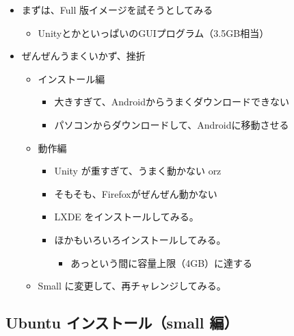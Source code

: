 \documentclass[mingoth,a4paper]{jsarticle}
\begin{document}
\begin{itemize}
 \item まずは、Full 版イメージを試そうとしてみる
       \begin{itemize}
        \item UnityとかといっぱいのGUIプログラム（3.5GB相当）
       \end{itemize}
 \item ぜんぜんうまくいかず、挫折
       \begin{itemize}
        \item インストール編
              \begin{itemize}
               \item 大きすぎて、Androidからうまくダウンロードできない
               \item パソコンからダウンロードして、Androidに移動させる
              \end{itemize}
        \item 動作編
              \begin{itemize}
               \item Unity が重すぎて、うまく動かない orz
               \item そもそも、Firefoxがぜんぜん動かない
               \item LXDE をインストールしてみる。
               \item ほかもいろいろインストールしてみる。
                     \begin{itemize}
                      \item あっという間に容量上限（4GB）に達する
                     \end{itemize}
              \end{itemize}
        \item Small に変更して、再チャレンジしてみる。
       \end{itemize}
\end{itemize}

\subsection{Ubuntu インストール（small 編）}
\end{document}
